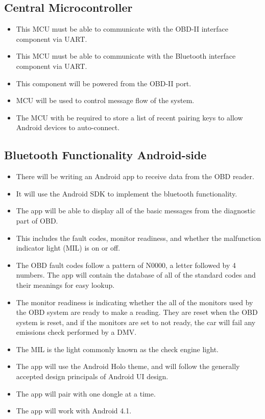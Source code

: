 \documentclass[12pt,letterpaper]{article}
\begin{document}
\subsection{Central Microcontroller}
\begin{itemize}
	\item This MCU must be able to communicate with the OBD-II interface component via UART.
	\item This MCU must be able to communicate with the Bluetooth interface component via UART.
	\item This component will be powered from the OBD-II port.
	\item MCU will be used to control message flow of the system.
	\item The MCU with be required to store a list of recent pairing keys to allow Android devices to auto-connect.
\end{itemize} 

\subsection{Bluetooth Functionality Android-side}
\begin{itemize}
	\item There will be writing an Android app to receive data from the OBD reader.
	\item It will use the Android SDK to implement the bluetooth functionality.
	\item The app will be able to display all of the basic messages from the diagnostic part of OBD.
	\item This includes the fault codes, monitor readiness, and whether the malfunction indicator light (MIL) is on or off.
	\item The OBD fault codes follow a pattern of N0000, a letter followed by 4 numbers. The app will contain the database of all of the standard codes and their meanings for easy lookup. 
	\item  The monitor readiness is indicating whether the all of the monitors used by the OBD system are ready to make a reading. They are reset when the OBD system is reset, and if the monitors are set to not ready, the car will fail any emissions check performed by a DMV. 
	\item The MIL is the light commonly known as the check engine light. 
	\item The app will use the Android Holo theme, and will follow the generally accepted design principals of Android UI design.
	\item The app will pair with one dongle at a time.
	\item The app will work with Android 4.1.

\end{itemize}
\end{document}

